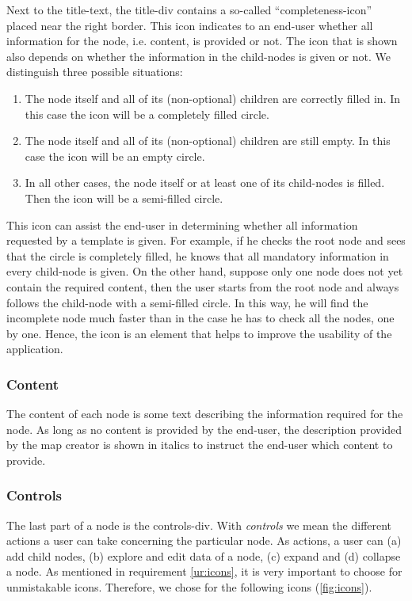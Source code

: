 Next to the title-text, the title-div contains a so-called ``completeness-icon'' placed near the right border. This icon indicates to an end-user whether all information for the node, i.e. content, is provided or not. The icon that is shown also depends on whether the information in the child-nodes is given or not. We distinguish three possible situations:
\begin{enumerate}
	\item The node itself and all of its (non-optional) children are correctly filled in. In this case the icon will be a completely filled circle.
	\item The node itself and all of its (non-optional) children are still empty. In this case the icon will be an empty circle.
	\item In all other cases, the node itself or at least one of its child-nodes is filled. Then the icon will be a semi-filled circle.
\end{enumerate}
This icon can assist the end-user in determining whether all information requested by a template is given. For example, if he checks the root node and sees that the circle is completely filled, he knows that all mandatory information in every child-node is given. On the other hand, suppose only one node does not yet contain the required content, then the user starts from the root node and always follows the child-node with a semi-filled circle. In this way, he will find the incomplete node much faster than in the case he has to check all the nodes, one by one. Hence, the icon is an element that helps to improve the usability of the application.



\subsubsection{Content}\label{sec:content}
The content of each node is some text describing the information required for the node. As long as no content is provided by the end-user, the description provided by the map creator is shown in italics to instruct the end-user which content to provide.



\subsubsection{Controls}\label{sec:controls}
The last part of a node is the controls-div. With \textit{controls} we mean the different actions a user can take concerning the particular node. As actions, a user can (a) add child nodes, (b) explore and edit data of a node, (c) expand and (d) collapse a node. As mentioned in requirement \ref{ur:icons}, it is very important to choose for unmistakable icons. Therefore, we chose for the following icons (\autoref{fig:icons}).

